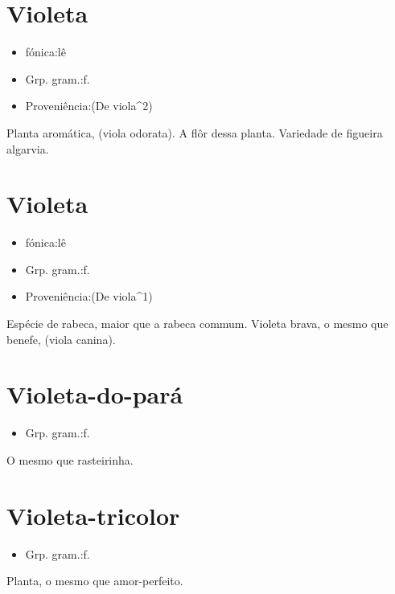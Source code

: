 \documentclass{article}
\begin{document}
\section{Violeta}
\begin{itemize}
\item {fónica:lê}
\end{itemize}
\begin{itemize}
\item {Grp. gram.:f.}
\end{itemize}
\begin{itemize}
\item {Proveniência:(De \textunderscore viola\textunderscore ^2)}
\end{itemize}
Planta aromática, (\textunderscore viola odorata\textunderscore ).
A flôr dessa planta.
Variedade de figueira algarvia.
\section{Violeta}
\begin{itemize}
\item {fónica:lê}
\end{itemize}
\begin{itemize}
\item {Grp. gram.:f.}
\end{itemize}
\begin{itemize}
\item {Proveniência:(De \textunderscore viola\textunderscore ^1)}
\end{itemize}
Espécie de rabeca, maior que a rabeca commum.
\textunderscore Violeta brava\textunderscore , o mesmo que \textunderscore benefe\textunderscore , (\textunderscore viola canina\textunderscore ).
\section{Violeta-do-pará}
\begin{itemize}
\item {Grp. gram.:f.}
\end{itemize}
O mesmo que \textunderscore rasteirinha\textunderscore .
\section{Violeta-tricolor}
\begin{itemize}
\item {Grp. gram.:f.}
\end{itemize}
Planta, o mesmo que \textunderscore amor-perfeito\textunderscore .
\end{document}
